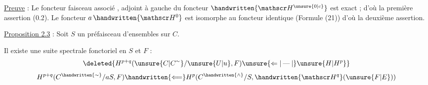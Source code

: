 \uline{Preuve} : Le foncteur faisceau associé , adjoint à gauche du foncteur $\handwritten{\mathscr H^{\unsure{0|c}}}$ est exact ; d'où la première assertion (0.2). Le foncteur $a\,\handwritten{\mathscr H^0}$ est isomorphe au foncteur identique (Formule (21)) d'où la deuxième assertion.

\uline{Proposition 2.3} : Soit $S$ un préfaisceau d'ensembles sur $C$.

Il existe une suite spectrale fonctoriel en $S$ et $F$ :
\[
\deleted{H^{p+q}(\unsure{C|C^\sim}/\unsure{U|u},F)\unsure{\Leftarrow|\mathbin{\text{---}}|{}}\unsure{H|H^p}}
\]
\[
H^{p+q}(C^{\handwritten{\sim}}/aS,F)\handwritten{\Longleftarrow}H^p(C^{\handwritten{\wedge}}/S,\handwritten{\mathscr H^q}(\unsure{F|E}))
\]

